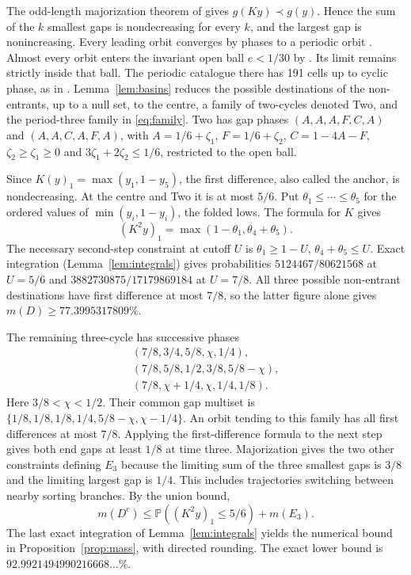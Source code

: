\documentclass[11pt,reqno]{amsart}
\theoremstyle{definition}
\newcommand{\Prob}{\mathbb P}
\begin{document}
The odd-length majorization theorem of \cite{G4} gives
\(g(Ky)\prec g(y)\). Hence the sum of the \(k\) smallest gaps is
nondecreasing for every \(k\), and the largest gap is nonincreasing.
Every leading orbit converges by phases to a periodic orbit
\cite[Lemma~2]{G6}. Almost every orbit enters the invariant open ball
\(e<1/30\) by \cite[Section~3]{G6}. Its limit remains strictly inside that
ball. The periodic catalogue there has 191 cells up to cyclic
phase, as in \cite[Appendix~A]{G6}. Lemma~\ref{lem:basins} reduces
the possible destinations of the non-entrants, up to a null set, to
the centre, a family of two-cycles denoted Two, and the period-three
family in \eqref{eq:family}. Two has gap phases \((A,A,A,F,C,A)\)
and \((A,A,C,A,F,A)\), with \(A=1/6+\zeta_1\), \(F=1/6+\zeta_2\),
\(C=1-4A-F\), \(\zeta_2\ge\zeta_1\ge0\) and \(3\zeta_1+2\zeta_2\le1/6\),
restricted to the open ball.

Since \(K(y)_1=\max(y_1,1-y_5)\), the first difference, also called
the anchor, is nondecreasing. At the centre and Two it is at most
\(5/6\). Put \(\theta_1\le\cdots\le\theta_5\) for the ordered values of
\(\min(y_i,1-y_i)\), the folded lows. The formula for \(K\) gives
\[
 (K^2y)_1=\max(1-\theta_1,\theta_4+\theta_5).
\]
The necessary second-step constraint at cutoff \(U\) is
\(\theta_1\ge1-U\), \(\theta_4+\theta_5\le U\). Exact integration
(Lemma~\ref{lem:integrals}) gives probabilities
\(5124467/80621568\) at \(U=5/6\) and
\(3882730875/17179869184\) at \(U=7/8\).
All three possible non-entrant destinations have first
difference at most \(7/8\), so the latter figure alone gives
\(m(D)\ge77.3995317809\%\).

The remaining three-cycle has successive phases
\begin{equation}\label{eq:family}
 \begin{gathered}
 (7/8,3/4,5/8,\chi,1/4),\\
 (7/8,5/8,1/2,3/8,5/8-\chi),\\
 (7/8,\chi+1/4,\chi,1/4,1/8).
 \end{gathered}
\end{equation}
Here \(3/8<\chi<1/2\). Their common gap multiset is
\(\{1/8,1/8,1/8,1/4,5/8-\chi,\chi-1/4\}\).
An orbit tending to this family has all first differences at most
\(7/8\). Applying the first-difference formula to the next step
gives both end gaps at least \(1/8\) at time three. Majorization
gives the two other constraints defining \(E_3\) because the
limiting sum of the three smallest gaps is \(3/8\) and the
limiting largest gap is \(1/4\). This includes trajectories
switching between nearby sorting branches. By the union bound,
\[
 m(D^c)\le \Prob((K^2y)_1\le5/6)+m(E_3).
\]
The last exact integration of Lemma~\ref{lem:integrals} yields
the numerical bound in Proposition~\ref{prop:mass}, with
directed rounding. The exact lower bound is
\(92.9921494990216668\ldots\%\).
\end{document}
